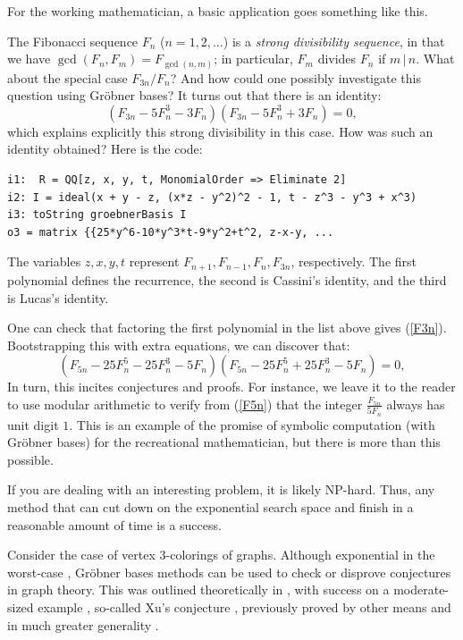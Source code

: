 
For the working mathematician, a basic application goes something like this.

The Fibonacci sequence $F_n$ ($n= 1, 2, \ldots$) is a \textit{strong divisibility sequence}, in that we have $\gcd(F_n, F_m) = F_{\gcd(n,m)}$; in particular, $F_m$ divides $F_n$ if $m \, | \, n$.  What about the special case $F_{3n}/F_n$?  And how could one possibly investigate this question using Gr\"obner bases?  It turns out that there is an identity:
\begin{equation}\label{F3n}
(F_{3n} - 5 F_n^3 - 3 F_n)(F_{3n} - 5 F_n^3 + 3 F_n) = 0,
\end{equation}
which explains explicitly this strong divisibility in this case.  How was such an identity obtained?  Here is the code:
\begin{M2}
\begin{verbatim}
i1:  R = QQ[z, x, y, t, MonomialOrder => Eliminate 2]
i2: I = ideal(x + y - z, (x*z - y^2)^2 - 1, t - z^3 - y^3 + x^3)
i3: toString groebnerBasis I
o3 = matrix {{25*y^6-10*y^3*t-9*y^2+t^2, z-x-y, ...
\end{verbatim}
\end{M2}  
\medskip
The variables $z,x,y,t$ represent $F_{n+1}, F_{n-1}, F_n, F_{3n}$, respectively.  The first polynomial defines the recurrence, the second is Cassini's identity, and the third is Lucas's identity.

One can check that factoring the first polynomial in the list above gives (\ref{F3n}).  Bootstrapping this with extra equations, we can discover that:
\begin{equation}\label{F5n}
(F_{5n} - 25 F_n^5 - 25 F_n^3 - 5 F_n)(F_{5n} - 25 F_n^5 + 25 F_n^3 - 5 F_n) = 0,
\end{equation}
In turn, this incites conjectures and proofs.  
For instance, we leave it to the reader to use modular arithmetic to verify from (\ref{F5n}) that the integer $\frac{F_{5n}}{5F_n}$ always has unit digit $1$.  This is an example of the promise of symbolic computation (with Gr\"obner bases) for the recreational mathematician, but there is more than this possible.

If you are dealing with an interesting problem, it is likely NP-hard.  Thus, any method that can cut down on the exponential search space and finish in a reasonable amount of time is a success.  

Consider the case of vertex 3-colorings of graphs.  Although exponential in the worst-case \cite[pp. 400]{yap2000fundamental}, Gr\"obner bases methods can be used to check or disprove conjectures in graph theory.  This was outlined theoretically in \cite{bayer1982division}, with success on a moderate-sized example \cite{hillar2008algebraic}, so-called Xu's conjecture \cite{shaoji1990size}, previously proved by other means and in much greater generality \cite{akbari2001kr}.


